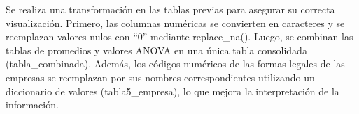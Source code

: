 \documentclass[
]{article}
\newenvironment{Shaded}{\begin{snugshade}}{\end{snugshade}}
\newcommand{\AttributeTok}[1]{\textcolor[rgb]{0.13,0.29,0.53}{#1}}
\newcommand{\DecValTok}[1]{\textcolor[rgb]{0.00,0.00,0.81}{#1}}
\newcommand{\FunctionTok}[1]{\textcolor[rgb]{0.13,0.29,0.53}{\textbf{#1}}}
\newcommand{\NormalTok}[1]{#1}
\newcommand{\OtherTok}[1]{\textcolor[rgb]{0.56,0.35,0.01}{#1}}
\newcommand{\SpecialCharTok}[1]{\textcolor[rgb]{0.81,0.36,0.00}{\textbf{#1}}}
\newcommand{\StringTok}[1]{\textcolor[rgb]{0.31,0.60,0.02}{#1}}
\begin{document}
\begin{Shaded}
\end{Shaded}

Se realiza una transformación en las tablas previas para asegurar su
correcta visualización. Primero, las columnas numéricas se convierten en
caracteres y se reemplazan valores nulos con ``0'' mediante
replace\_na(). Luego, se combinan las tablas de promedios y valores
ANOVA en una única tabla consolidada (tabla\_combinada). Además, los
códigos numéricos de las formas legales de las empresas se reemplazan
por sus nombres correspondientes utilizando un diccionario de valores
(tabla5\_empresa), lo que mejora la interpretación de la información.
\end{document}
